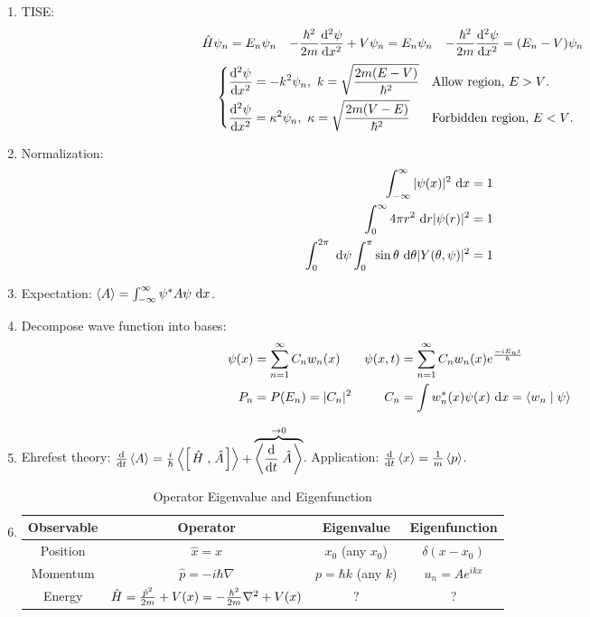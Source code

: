 \documentclass{school-22.101-notes}
\begin{document}
\clearpage
{}
\begin{enumerate}
\item TISE: 
  \begin{align}
    \hat{H} \psi_n  &= E_n \psi_n  & 
    - \frac{\hbar^2}{2m} \frac{\mathrm{d}^{2}\psi}{\mathrm{d}x^{2}} + V \psi_n  &= E_n \psi_n  & - \frac{\hbar^2}{2m} \frac{\mathrm{d}^{2}\psi}{\mathrm{d}x^{2}}   &= (E_n - V) \psi_n  
\end{align}
\begin{align}
\begin{dcases*}
\dpsidxn2 = - k^2 \psi_n, \fsp k = \sqrt{\frac{2 m (E - V)}{\hbar^2}} & Allow region, $E > V$. \\
\dpsidxn2 = \kappa^2 \psi_n, \fsp \kappa = \sqrt{\frac{2 m (V - E)}{\hbar^2}} & Forbidden region, $E < V$. 
\end{dcases*}
  \end{align}


  
\item Normalization:
\begin{align}
\int_{-\infty}^{\infty} |\psi(x)|^2 \mbox{ }\mathrm{d} x &= 1 \\
\int_0^{\infty} 4 \pi r^2 \mbox{ }\mathrm{d} r |\psi(r)|^2 &= 1 \\
\int_0^{2 \pi} \mbox{ }\mathrm{d} \psi \int_0^{\pi} \sin \theta \mbox{ }\mathrm{d} \theta |Y(\theta, \psi)|^2 &= 1 
\end{align}

\item Expectation: $ \left< A \right> = \int_{-\infty}^{\infty} \psi^* A \psi \mbox{ }\mathrm{d} x $.

\item Decompose wave function into bases: 
\begin{align}
\psi(x) &= \displaystyle\sum_{n=1}^{\infty} C_n w_n (x) & \psi (x,t) &= \displaystyle\sum_{n=1}^{\infty} C_n w_n(x) e^{ \frac{-iE_nt}{\hbar} } \\
P_n &= P(E_n) = |C_n|^2  & C_n &= \int w_n^* (x) \psi(x) \mbox{ }\mathrm{d} x = \langle w_n \mid \psi \rangle
\end{align}

\item Ehrefest theory: $ \frac{\mathrm{d}}{\mathrm{d}t} \left< A \right> = \frac{i}{\hbar} \left< \left[ \left. \hat{H} \right., \left. \hat{A} \right. \right]  \right> + \overbrace{\left< \frac{\mathrm{d}}{\mathrm{d}t} \left. \hat{A} \right. \right>}^{\to 0} $. Application: $\frac{\mathrm{d}}{\mathrm{d}t} \left< x \right> = \frac{1}{m} \left< p \right>$. 

\item 

\begin{table}[h]
  \centering 
  \begin{tabular}{|c|c|c|c|} \hline
    Observable & Operator & Eigenvalue & Eigenfunction \\ \hline
    Position & $\hat{x} = x$ & $x_0$ (any $x_0$) & $\delta (x - x_0)$ \\ \hline
    Momentum & $\hat{p} = - i \hbar \nabla$ & $p = \hbar k$ (any $k$) & $u_n = A e^{ikx}$ \\ \hline
    Energy & $\hat{H} = \frac{\hat{p}^2}{2m} + V(x) = - \frac{\hbar^2}{2m} \nabla^2 + V(x)$ & ? & ? \\ \hline
  \end{tabular}
  \caption{Operator Eigenvalue and Eigenfunction}
\end{table}


\end{enumerate}
\end{document}
